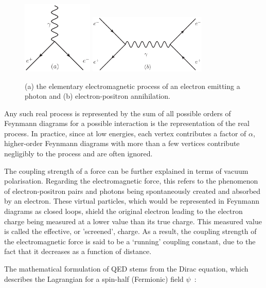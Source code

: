 \begin{figure}[hbtp]
   \centering
     \includegraphics[width=0.3\textwidth]{Chapters/03_Theory/Images/e_e_gamma}\hfill
     \includegraphics[width=0.5\textwidth]{Chapters/03_Theory/Images/e_e_gamma_e_e}
     \caption[Elementary electromagnetic processes.]{(a) the elementary electromagnetic process of an electron
     emitting a photon and (b) electron-positron annihilation.}
     \label{fig:qed_processes}
\end{figure}

Any such real process is represented by the sum of all possible orders of Feynmann diagrams for a possible
interaction is the representation of the real process. In practice, since at low energies, each vertex
contributes a factor of $\alpha$, higher-order Feynmann diagrams with more than a few vertices contribute
negligibly to the process and are often ignored.

The coupling strength of a force can be further explained in terms of vacuum polarisation. Regarding the
electromagnetic force, this refers to the phenomenon of electron-positron pairs and photons being
spontaneously created and absorbed by an electron. These virtual particles, which would be represented in
Feynmann diagrams as closed loops, shield the original electron leading to the electron charge being measured
at a lower value than its true charge. This measured value is called the effective, or 'screened', charge. As
a result, the coupling strength of the electromagnetic force is said to be a `running' coupling
constant, due to the fact that it decreases as a function of distance.

The mathematical formulation of QED stems from the Dirac equation, which describes the Lagrangian for a
spin-half (Fermionic) field $\psi$~\cite{Dirac610}:

